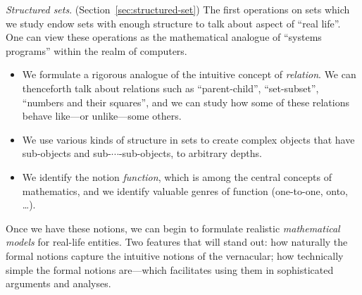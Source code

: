 {\it Structured sets}.  (Section~\ref{sec:structured-set}) The first operations on sets which we study endow sets with enough structure to talk about aspect of  ``real life''.  One can view these operations as the mathematical analogue of ``systems programs'' within the realm of computers.
\begin{itemize}
\item
We formulate a rigorous analogue of the intuitive concept of {\it relation}.  We can thenceforth talk about relations such as ``parent-child'', ``set-subset'', ``numbers and their squares'', and we can study how some of these relations behave like---or unlike---some others.
\item
We use various kinds of structure in sets to create complex objects that have sub-objects and sub-$\cdots$-sub-objects, to arbitrary depths.
\item
We identify the notion {\it function}, which is among the central concepts of mathematics, and we identify valuable genres of function (one-to-one, onto, \ldots).
\end{itemize}
Once we have these notions, we can begin to formulate realistic {\it mathematical models} for real-life entities.  Two features that will stand out: how naturally the formal notions capture the intuitive notions of the vernacular; how technically simple the formal notions are---which facilitates using them in sophisticated arguments and analyses.

\bigskip

